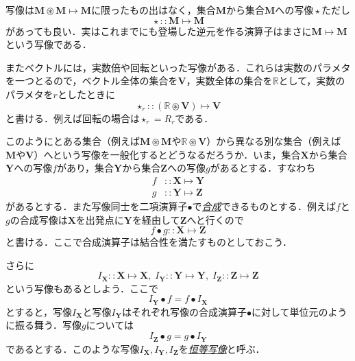 \documentclass[a4paper]{jsbook}
\newcommand{\keyword}[1]{{\underline{\emph{#1}}}}
\newcommand{\mathSet}[1]{\mathbf{#1}} %
\newcommand{\mathSpecialSet}[1]{\mathbb{#1}} %
\DeclareMathOperator{\mathAnyUnaryOperator}{\star}
\newcommand{\mathCompose}{\mathbin{\bullet}}
\newcommand{\mathIn}{\mathrel{::}}
\newcommand{\mathSetTimes}{\mathbin{\circledast}}
\newcommand{\mathMapsTo}{\mapsto}
\newcommand{\mathMorph}[2]{#1\mathMapsTo#2}
\begin{document}
写像は$\mathMorph{\mathSet{M}\mathSetTimes\mathSet{M}}{\mathSet{M}}$に限ったもの出はなく，集合$\mathSet{M}$から集合$\mathSet{M}$への写像$\mathAnyUnaryOperator$ただし
\begin{equation}
\mathAnyUnaryOperator\mathIn\mathMorph{\mathSet{M}}{\mathSet{M}}
\end{equation}
があっても良い．実はこれまでにも登場した逆元を作る演算子はまさに$\mathMorph{\mathSet{M}}{\mathSet{M}}$という写像である．

またベクトルには，実数倍や回転といった写像がある．これらは実数のパラメタを一つとるので，ベクトル全体の集合を$\mathSet{V}$，実数全体の集合を$\mathSpecialSet{R}$として，実数のパラメタを$r$としたときに
\begin{equation}
\mathAnyUnaryOperator_r\mathIn{}\mathMorph{(\mathSpecialSet{R}\mathSetTimes\mathSet{V})}{\mathSet{V}}
\end{equation}
と書ける．例えば回転の場合は$\mathAnyUnaryOperator_r=R_r$である．

このようにとある集合（例えば$\mathSet{M}\mathSetTimes\mathSet{M}$や$\mathSpecialSet{R}\mathSetTimes\mathSet{V}$）から異なる別な集合（例えば$\mathSet{M}$や$\mathSet{V}$）へという写像を一般化するとどうなるだろうか．いま，集合$\mathSet{X}$から集合$\mathSet{Y}$への写像$f$があり，集合$\mathSet{Y}$から集合$\mathSet{Z}$への写像$g$があるとする．すなわち
\begin{align}
f&\mathIn\mathMorph{\mathSet{X}}{\mathSet{Y}}\\
g&\mathIn\mathMorph{\mathSet{Y}}{\mathSet{Z}}
\end{align}
があるとする．また写像同士を二項演算子$\mathCompose$で\keyword{合成}できるものとする．例えば$f$と$g$の合成写像は$\mathSet{X}$を出発点に$\mathSet{Y}$を経由して$\mathSet{Z}$へと行くので
\begin{equation}
f\mathCompose g\mathIn\mathMorph{\mathSet{X}}{\mathSet{Z}}
\end{equation}
と書ける．ここで合成演算子は結合性を満たすものとしておこう．

さらに
\begin{equation}
I_\mathSet{X}\mathIn\mathMorph{\mathSet{X}}{\mathSet{X}},\;I_\mathSet{Y}\mathIn\mathMorph{\mathSet{Y}}{\mathSet{Y}},\;I_\mathSet{Z}\mathIn\mathMorph{\mathSet{Z}}{\mathSet{Z}}
\end{equation}
という写像もあるとしよう．ここで
\begin{equation}
I_\mathSet{Y}\mathCompose f=f\mathCompose I_\mathSet{X}
\end{equation}
とすると，写像$I_\mathSet{X}$と写像$I_\mathSet{Y}$はそれぞれ写像の合成演算子$\mathCompose$に対して単位元のように振る舞う．写像$g$については
\begin{equation}
I_\mathSet{Z}\mathCompose g=g\mathCompose I_\mathSet{Y}
\end{equation}
であるとする．このような写像$I_\mathSet{X},I_\mathSet{Y},I_\mathSet{Z}$を\keyword{恒等写像}と呼ぶ．
\end{document}
